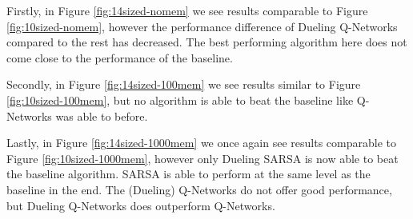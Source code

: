 Firstly, in Figure \ref{fig:14sized-nomem} we see results comparable to Figure \ref{fig:10sized-nomem}, however the performance difference of Dueling Q-Networks compared to the rest has decreased. The best performing algorithm here does not come close to the performance of the baseline.

Secondly, in Figure \ref{fig:14sized-100mem} we see results similar to Figure \ref{fig:10sized-100mem}, but no algorithm is able to beat the baseline like Q-Networks was able to before.

Lastly, in Figure \ref{fig:14sized-1000mem} we once again see results comparable to Figure \ref{fig:10sized-1000mem}, however only Dueling SARSA is now able to beat the baseline algorithm. SARSA is able to perform at the same level as the baseline in the end. The (Dueling) Q-Networks do not offer good performance, but Dueling Q-Networks does outperform Q-Networks.


